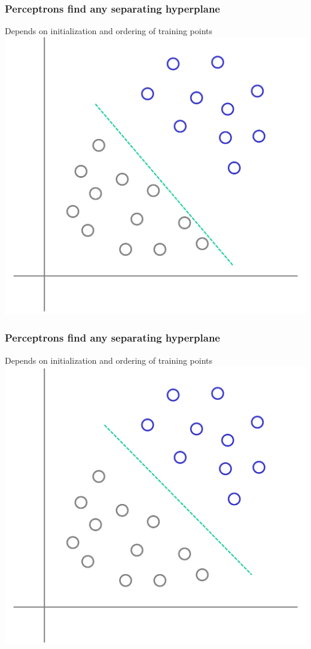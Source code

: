\documentclass[12pt,notes,mathserif]{beamer}
\begin{document}
\begin{frame}[c]
	\frametitle{Perceptrons find any separating hyperplane}
	\begin{center}
		Depends on initialization and ordering of training points\\
		\includegraphics[width=0.7\linewidth]{fig8/lec84.jpg}
	\end{center}
\end{frame}

\begin{frame}[c]
	\frametitle{Perceptrons find any separating hyperplane}
	\begin{center}
		Depends on initialization and ordering of training points\\
		\includegraphics[width=0.7\linewidth]{fig8/lec85.jpg}
	\end{center}
\end{frame}
\end{document}
